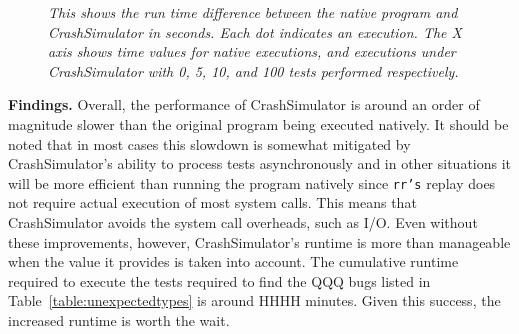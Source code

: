     \begin{figure}[t]
        \center{}
        \caption{\emph{This shows the run time difference between the
native program and CrashSimulator in seconds.  Each dot indicates an
        execution.  The X axis shows time values for native executions, and
        executions under CrashSimulator with 0, 5, 10, and 100 tests
        performed respectively.
}}
         \label{figure:performance}

    \end{figure}


{\bf Findings.} Overall, the performance of CrashSimulator is around
an order of magnitude slower than the original program being executed
natively.  It should be noted that in most cases
this slowdown is somewhat mitigated by CrashSimulator's ability to process
tests asynchronously and in other situations it will be more efficient than
running the program natively since {\tt rr's} replay does not require
actual execution of most system calls.  This means that CrashSimulator
avoids the system call overheads, such as I/O.
Even without these improvements, however, CrashSimulator's runtime is more
than manageable when the value it provides is taken into account.  The
cumulative runtime required to execute the tests required to find the QQQ
bugs listed in Table~\ref{table:unexpectedtypes} is around HHHH minutes.
Given this success, the increased runtime is worth the wait.
